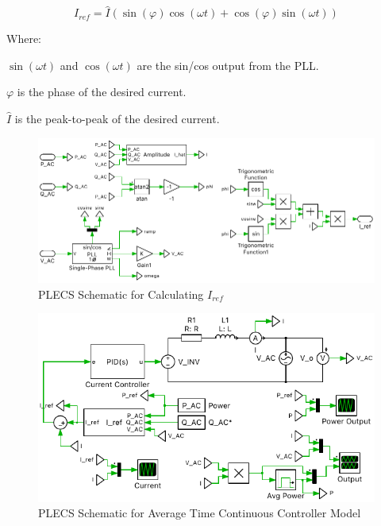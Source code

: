 \documentclass[12pt]{article}
\begin{document}
\begin{equation} \label{eq:ref-current}
    I_{ref} = \hat{I} (\sin(\varphi)\cos(\omega{t}) + \cos(\varphi)\sin(\omega{t}))
\end{equation}

Where:

$\sin(\omega{t})$ and $\cos(\omega{t})$ are the sin/cos output from the PLL.

$\varphi$ is the phase of the desired current.

$\hat{I}$ is the peak-to-peak of the desired current.

\begin{figure}[ht]
    \centering{}
    \includegraphics[width=\textwidth, height=0.4\textheight, keepaspectratio]{img/Iref Calculation.pdf}
    \caption{PLECS Schematic for Calculating $I_{ref}$}
    \label{fig:iref-calculation}
\end{figure}

\begin{figure}[ht]
    \centering{}
    \includegraphics[width=\textwidth, height=0.4\textheight, keepaspectratio]{img/Average Time C Model.pdf}
    \caption{PLECS Schematic for Average Time Continuous Controller Model}
    \label{fig:avg-time-c-model}
\end{figure}
\end{document}
